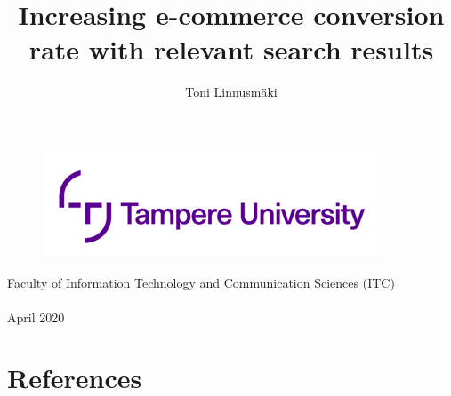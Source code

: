 \documentclass[12pt,a4paper,english]{tunithesis}
\author{Toni Linnusmäki}
\title{Increasing e-commerce conversion rate with relevant search results} %
\begin{document}
\makeatletter


%
\thispagestyle{empty}
\vspace*{-.5cm}\noindent

\begin{figure}
    \vspace{-1.3cm}
    \advance\leftskip-2.5cm
    \noindent\includegraphics{tunilogo.png}
\end{figure}
 
\vspace{2.5cm}
\begin{flushright}
\noindent\textsf{\LARGE{\@author}}

\noindent\vspace{0.5cm}

\noindent\Huge{\textsf{\textbf{\textcolor{tunipurple}{\@title}}}}
\end{flushright}
\vspace{12.7cm} %

\begin{flushright}  
    \begin{spacing}{1.0}
        \textsf{Faculty of Information Technology and Communication Sciences (ITC)\\
        \@thesistype\\
        April 2020}
    \end{spacing}
\end{flushright}






\setcounter{tocdepth}{3}              %
\tableofcontents                      %
\clearpage

\renewcommand{\chaptername}{} %



% 

%
%
\clearpage

\chapter{References}
\printbibliography[heading=none]
\end{document}
